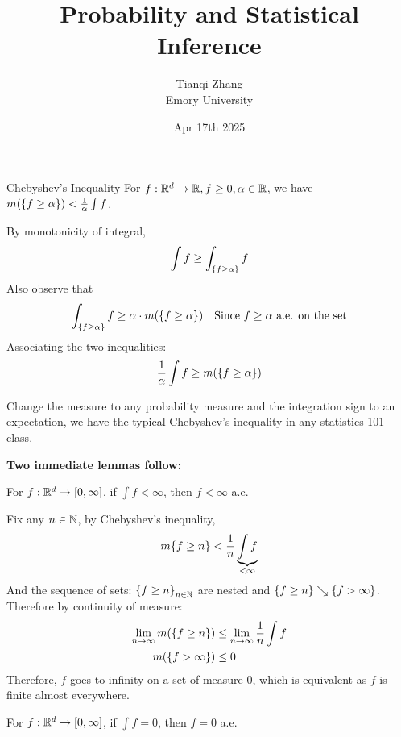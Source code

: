 

\title{\textbf{%
               Probability and Statistical Inference}}
\author{Tianqi Zhang\\
Emory University}
\date{Apr 17th 2025}


\maketitle

\begin{thm}{Chebyshev's Inequality}
For $f: {\mathbb{R}}^d \to {\mathbb{R}}, f\geq 0, \alpha \in {\mathbb{R}}$, we have $m(\qty{f\geq \alpha}) <\frac{1}{\alpha}\int f$. \\
\end{thm}


\begin{prf*}
By monotonicity of integral, 
$$\int f\geq \int_{\qty{f\geq \alpha}} f$$
Also observe that 
$$\int_{\qty{f\geq \alpha}} f \geq \alpha\cdot m(\qty{f\geq \alpha})\quad \text{Since }f\geq \alpha \text{ a.e. on the set}$$
Associating the two inequalities: 
$$\frac{1}{\alpha} \int f\geq m(\qty{f\geq \alpha})$$

\end{prf*}
\begin{rmk}{}
Change the measure to any probability measure and the integration sign to an expectation, we have the typical Chebyshev's inequality in any statistics 101 class. 	
\end{rmk}



\newpage
\noindent \textbf{Two immediate lemmas follow: }\\

\begin{lem}{}
For $f:{\mathbb{R}}^d\to [0, \infty]$, if $\int f<\infty$, then $f<\infty$ a.e. 
\end{lem}

\begin{prf*}
	Fix any $n\in \mathbb{N}$, by Chebyshev's inequality, 
	$$m\qty{f\geq n} < \frac{1}{n} \underbrace{\int f}_{<\infty}$$
	And the sequence of sets: $\qty{f\geq n}_{n\in \mathbb{N}}$ are nested and $ \qty{f\geq n}\searrow \qty{f>\infty}$. Therefore by continuity of measure: 
	\begin{align*}
		\lim_{n\to\infty} m(\qty{f\geq n}) &\leq \lim_{n\to\infty} \frac{1}{n}\int f\\
		m(\qty{f>\infty}) &\leq 0\\
	\end{align*}
	Therefore, $f$ goes to infinity on a set of measure 0, which is equivalent as $f$ is finite almost everywhere. 
	
	
\end{prf*}
\begin{lem}{}
	For $f: {\mathbb{R}}^d \to [0, \infty]$, if $\int f = 0$, then $f=0$ a.e.
\end{lem}

